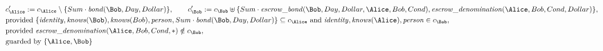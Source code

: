 \begin{align*}
&
c'_
{
\Alice
}
 := 
c_
{
\Alice
}
 \setminus 
\{
Sum
\cdot
\mathit{\detokenize{
bond
}}
(
\Bob
,
Day
,
Dollar
)
\}
, \qquad 
c'_
{
\Bob
}
 := 
c_
{
\Bob
}
 \uplus 
\{
Sum
\cdot
\mathit{\detokenize{
escrow_bond
}}
(
\Bob
,
Day
,
Dollar
,
\Alice
,
Bob
,
Cond
)
,
\mathit{\detokenize{
escrow_denomination
}}
(
\Alice
,
Bob
,
Cond
,
Dollar
)
\}
,\\
&
\text{provided } 
\{
\mathit{\detokenize{
identity
}}
,
\mathit{\detokenize{
knows
}}
(
\Bob
)
,
\mathit{\detokenize{
knows
}}
(
Bob
)
,
\mathit{\detokenize{
person
}}
,
Sum
\cdot
\mathit{\detokenize{
bond
}}
(
\Bob
,
Day
,
Dollar
)
\}
 \subseteq c_
{
\Alice
}
 \text{ and } 
\mathit{\detokenize{
identity
}}
,
\mathit{\detokenize{
knows
}}
(
\Alice
)
,
\mathit{\detokenize{
person
}}
 \in c_
{
\Bob
}
,\\
&
\text{provided } 
\mathit{\detokenize{
escrow_denomination
}}
(
\Alice
,
Bob
,
Cond
,
\ast
)
 \notin c_
{
\Bob
}
,\\
&
\text{guarded by } \{
\Alice
,
\Bob
\}
\end{align*}

